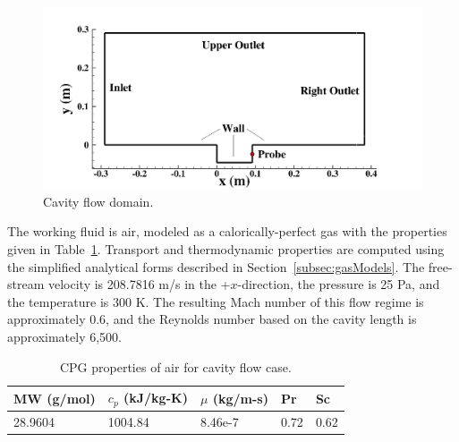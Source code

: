 \begin{figure}
    \centering
	\includegraphics[width=0.9\linewidth]{Chapters/CavityAndCVRC/Images/cavity/geom.png}
    \caption{\label{fig:cavityGeom}Cavity flow domain.}
\end{figure}

The working fluid is air, modeled as a calorically-perfect gas with the properties given in Table~\ref{tab:airProps}. Transport and thermodynamic properties are computed using the simplified analytical forms described in Section~\ref{subsec:gasModels}. The free-stream velocity is 208.7816 m/s in the +$x$-direction, the pressure is 25 Pa, and the temperature is 300 K. The resulting Mach number of this flow regime is approximately 0.6, and the Reynolds number based on the cavity length is approximately 6,500.

\begin{table}
	\centering
	\begin{tabular}{ lllll }
	\toprule
	MW (g/mol) & $c_p$ (kJ/kg-K) & $\mu$ (kg/m-s) & Pr & Sc   \\
	\midrule
	28.9604 & 1004.84 & 8.46e-7 & 0.72 & 0.62 \\
	\bottomrule
	\end{tabular}
	\caption{\label{tab:airProps}CPG properties of air for cavity flow case.}
\end{table}

